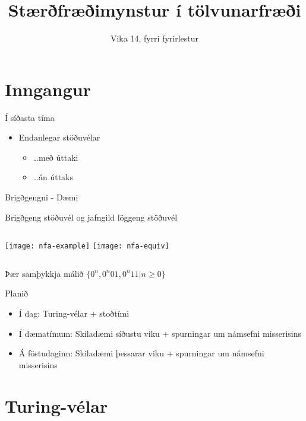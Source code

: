 \documentclass{beamer}
\title{Stærðfræðimynstur í tölvunarfræði}
\subtitle{Vika 14, fyrri fyrirlestur}
\begin{document}
\begin{frame}
\titlepage
\end{frame}


\section{Inngangur}

\begin{frame}{Í síðasta tíma}
\begin{itemize}
 \item Endanlegar stöðuvélar
 \begin{itemize}
  \item \ldots með úttaki
  \item \ldots án úttaks
 \end{itemize}
\end{itemize}
\end{frame}

\begin{frame}{Brigðgengni - Dæmi}
\begin{center}
Brigðgeng stöðuvél og jafngild löggeng stöðuvél
\end{center}
\begin{columns}
\texttt{[image: nfa-example]}
\texttt{[image: nfa-equiv]}
\end{columns}
\begin{center}
Þær samþykkja málið $\{0^n , 0^n01, 0^n11 | n \geq 0\}$
\end{center}
\end{frame}

\begin{frame}{Planið}
\begin{itemize}
 \item Í dag: Turing-vélar + stoðtími
 \item Í dæmatímum: Skiladæmi síðustu viku + spurningar um námsefni misserisins
 \item Á föstudaginn: Skiladæmi þessarar viku + spurningar um námsefni misserisins
\end{itemize}
\end{frame}

\section{Turing-vélar}
\end{document}
